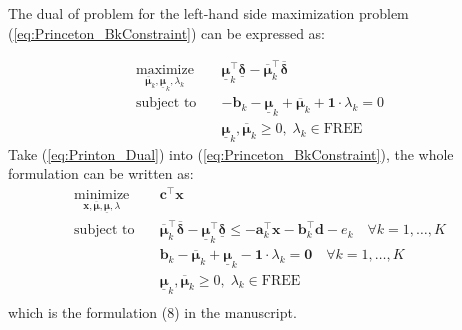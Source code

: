 \documentclass{article}
\newcommand{\mb}[1]{\mathbf{#1}}
\newcommand{\mbg}[1]{\boldsymbol{#1}}
\begin{document}
The dual of problem for the left-hand side maximization problem (\ref{eq:Princeton_BkConstraint}) can be expressed as:

\begin{align}
    \underset{\overline{\mbg{\mu}}_k,\underline{\mbg{\mu}}_k,\lambda_k}{\text{maximize}}\quad& \underline{\mbg{\mu}}_k^{\top}\underline{\mbg{\delta}}-\overline{\mbg{\mu}}_k^{\top}\overline{\mbg{\delta}} \label{eq:Printon_Dual} \\ \nonumber
    \text{subject to} \quad& -\mb{b}_{k}-\underline{\mbg{\mu}}_k+\overline{\mbg{\mu}}_k+\bm{1}\cdot\lambda_k=0 \\ \nonumber
    \quad& \underline{\mbg{\mu}}_k,\overline{\mbg{\mu}}_k \geqslant 0,\;\lambda_k \in \text{FREE} 
\end{align} 
Take (\ref{eq:Printon_Dual}) into (\ref{eq:Princeton_BkConstraint}), the whole formulation can be written as:
\begin{subequations}
\begin{align}
    \underset{\mb{x},\overline{\mbg{\mu}},\underline{\mbg{\mu}},\lambda}{\text{minimize}}\quad& \mb{c}^{\top}\mb{x}\\
    \text{subject to}\quad& \overline{\mbg{\mu}}_k^{\top}\overline{\mbg{\delta}}-\underline{\mbg{\mu}}_k^{\top}\underline{\mbg{\delta}} \leqslant-\mb{a}_{k}^{\top}\mb{x}-\mb{b}_k^{\top}\mb{d}-e_{k} \quad \forall k=1,\dots,K\\
    \quad&\mb{b}_{k}-\overline{\mbg{\mu}}_k+\underline{\mbg{\mu}}_k-\bm{1}\cdot\lambda_k=\bm{0}\quad \forall k=1,\dots,K\\
    \quad& \underline{\mbg{\mu}}_k,\overline{\mbg{\mu}}_k \geqslant 0,\;\lambda_k \in \text{FREE}\\
\end{align}
\label{eq:Princeton_BkDelta}
\end{subequations}
which is the formulation (8) in the manuscript.
\end{document}
